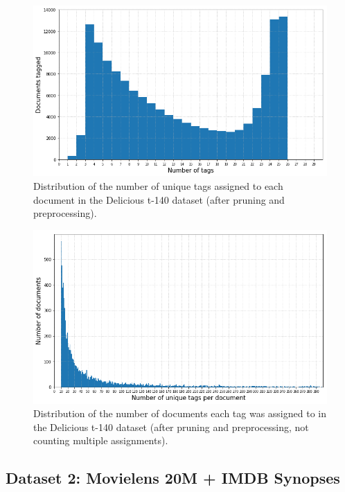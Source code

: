 \begin{figure}[!h]
    \centering
    \includegraphics[width=\textwidth]{chapters/05_experiments/images/delicious_tag_per_resource.png}
    \caption{Distribution of the number of unique tags assigned to each document in the Delicious t-140 dataset (after pruning and preprocessing).}
    \label{fig:delicious_tag_doc_distr}
\end{figure}

\begin{figure}[!h]
    \centering
    \includegraphics[width=\textwidth]{chapters/05_experiments/images/delicious_resource_per_tag.png}
    \caption{Distribution of the number of documents each tag was assigned to in the Delicious t-140 dataset (after pruning and preprocessing, not counting multiple assignments).}
    \label{fig:delicious_tag_doc_distr}
\end{figure}

\subsection{Dataset 2: Movielens 20M + IMDB Synopses}\label{subsec:dataset_2}

